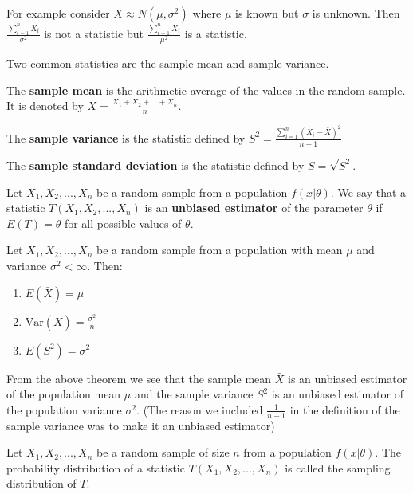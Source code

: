For example consider $X \approx N(\mu, \sigma^2)$ where $\mu$ is known but $\sigma$ is unknown. Then $\frac{\sum_{i=1}^n X_i}{\sigma^2}$ is not a statistic but $\frac{\sum_{i=1}^n X_i}{\mu^2}$ is a statistic.

Two common statistics are the sample mean and sample variance.

\begin{defn}
    The \textbf{sample mean} is the arithmetic average of the values in the random sample. It is denoted by $\bar{X} = \displaystyle \frac{X_1 + X_2 + ... + X_n}{n}$.

    The \textbf{sample variance} is the statistic defined by $S^2 = \displaystyle \frac{\sum_{i=1}^n \left (X_i - \bar{X}\right )^2}{n-1}$

    The \textbf{sample standard deviation} is the statistic defined by $S = \sqrt{S^2}$.
\end{defn}

\begin{defn}
    Let $X_1, X_2, ..., X_n$ be a random sample from a population $f\left (x| \theta\right )$. We say that a statistic $T\left (X_1, X_2, ...,X_n\right )$ is an \textbf{unbiased estimator} of the parameter $\theta$ if $E(T) = \theta$ for all possible values of $\theta$.
\end{defn}

\begin{thm}
    Let $X_1, X_2, ..., X_n$ be a random sample from a population with mean $\mu $ and variance $\sigma ^2 < \infty$. Then:
    \begin{enumerate}
        \item $E\left (\bar{X}\right ) = \mu $
        \item $\text{Var}\left (\bar{X}\right ) = \frac{\sigma ^2}{n}$
        \item $E\left (S ^2\right ) = \sigma ^2$
    \end{enumerate}
\end{thm}

From the above theorem we see that the sample mean $\bar{X}$ is an unbiased estimator of the population mean $\mu$ and the sample variance $S^2$ is an unbiased estimator of the population variance $\sigma^2$. (The reason we included $\frac{1}{n-1}$ in the  definition of the sample variance was to make it an unbiased estimator)

\begin{defn}
    Let $X_1, X_2, ..., X_n$ be a random sample of size $n$ from a population $f(x|\theta)$. The probability distribution of a statistic $T(X_1, X_2, ..., X_n)$ is called the sampling distribution of $T$.
\end{defn}

